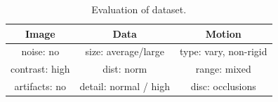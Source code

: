\begin{table}[ht] \footnotesize
\centering
\caption{Evaluation of \rub dataset.}
\begin{tabular}{ccc}
\toprule
\textbf{Image} & \textbf{Data}   & \textbf{Motion}   \\ 
\midrule
\cellcolor{good} noise: no      	    & \cellcolor{good} size:  average/large  		& \cellcolor{norm}type: vary, non-rigid    \\ 
\cellcolor{good} contrast: high  	& \cellcolor{good} dist: norm     	& \cellcolor{norm} range: mixed  \\ 
\cellcolor{good} artifacts: no       & \cellcolor{good}detail: normal / high 	&  \cellcolor{norm} disc: occlusions   \\ 
\bottomrule
\end{tabular}
\label{tab:eval_rub}%
\end{table}



